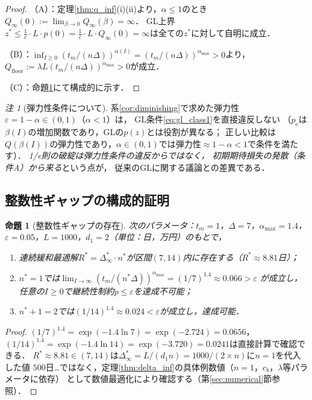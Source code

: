 \documentclass[12pt,a4paper]{article}
\theoremstyle{plain}
\newtheorem{proposition}[theorem]{命題}
\theoremstyle{definition}
\theoremstyle{remark}
\newtheorem{remark}[theorem]{注}
\newcommand{\pe}{p_{\mathrm{e}}}
\newcommand{\Qinf}{Q_{\infty}}
\newcommand{\betaI}{\beta(I)}
\newcommand{\alphI}{\alpha(I)}
\newcommand{\Dopt}{\Delta^{*}}
\begin{document}
\begin{proof}
（A）：定理\ref{thm:q_inf}(i)(ii)より，$\alpha\le1$のとき$\Qinf(0):=\lim_{\beta\to0}\Qinf(\beta)=\infty$．
GL上界$z^*\le\frac{1}{e}\cdot L\cdot p(0)=\frac{1}{e}\cdot L\cdot\Qinf(0)=\infty$は全ての$z^*$に対して自明に成立．

（B）：$\inf_{I\ge0}(t_m/(n\Delta))^{\alphI}=(t_m/(n\Delta))^{\alpha_{\max}}>0$より，
$Q_{\mathrm{floor}}:=\lambda L(t_m/(n\Delta))^{\alpha_{\max}}>0$が成立．

（C）：命題\ref{prop:gap}にて構成的に示す．
\end{proof}

\begin{remark}[弾力性条件について]
系\ref{cor:diminishing}で求めた弾力性$\varepsilon=1-\alpha\in(0,1)$（$\alpha<1$）は，
GL条件\eqref{eq:gl_class1}を直接違反しない
（$\pe$は$\betaI$の増加関数であり，GLの$p(z)$とは役割が異なる；
正しい比較は$Q(\betaI)$の弾力性であり，$\alpha\in(0,1)$では弾力性$\approx 1-\alpha<1$で条件を満たす）．
\emph{1/e則の破綻は弾力性条件の違反からではなく，
初期期待損失の発散（条件A）から来る}という点が，
従来のGLに関する議論との差異である．
\end{remark}

\subsection{整数性ギャップの構成的証明}

\begin{proposition}[整数性ギャップの存在]\label{prop:gap}
次のパラメータ：$t_m=1$，$\Delta=7$，$\alpha_{\max}=1.4$，
$\varepsilon=0.05$，$L=1000$，$d_1=2$（単位：日，万円）のもとで，
\begin{enumerate}[label=(\roman*)]
\item 連続緩和最適解$R^*=\Dopt_\infty\cdot n^*$が区間$(7,14)$内に存在する（$R^*\approx8.81$日）；
\item $n^*=1$では$\lim_{I\to\infty}(t_m/(n^*\Delta))^{\alpha_{\max}}=(1/7)^{1.4}\approx0.066>\varepsilon$
  が成立し，任意の$I\ge0$で継続性制約$p\le\varepsilon$を達成不可能；
\item $n^*+1=2$では$(1/14)^{1.4}\approx0.024<\varepsilon$が成立し，達成可能．
\end{enumerate}
\end{proposition}

\begin{proof}
$(1/7)^{1.4}=\exp(-1.4\ln7)=\exp(-2.724)=0.0656$，
$(1/14)^{1.4}=\exp(-1.4\ln14)=\exp(-3.720)=0.0241$は直接計算で確認できる．
$R^*\approx8.81\in(7,14)$は$\Dopt_\infty=L/(d_1 n)=1000/(2\times n)$に$n=1$を代入した値
$500$日…ではなく，定理\ref{thm:delta_inf}の具体例数値（$n=1$，$c_b$，$\lambda$等パラメータに依存）
として数値最適化により確認する（第\ref{sec:numerical}節参照）．
\end{proof}
\end{document}
